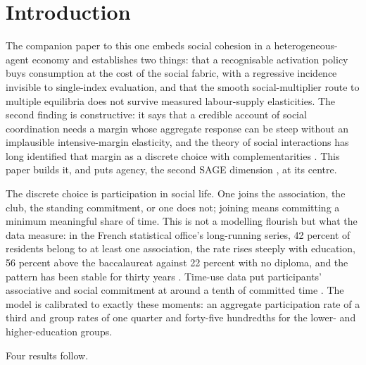 \documentclass[11pt]{article}
\begin{document}
\section{Introduction}

The companion paper to this one embeds social cohesion in a heterogeneous-agent economy and establishes two things: that a recognisable activation policy buys consumption at the cost of the social fabric, with a regressive incidence invisible to single-index evaluation, and that the smooth social-multiplier route to multiple equilibria does not survive measured labour-supply elasticities. The second finding is constructive: it says that a credible account of social coordination needs a margin whose aggregate response can be steep without an implausible intensive-margin elasticity, and the theory of social interactions has long identified that margin as a discrete choice with complementarities \citep{brock2001}. This paper builds it, and puts agency, the second SAGE dimension \citep{snower2020}, at its centre.

The discrete choice is participation in social life. One joins the association, the club, the standing commitment, or one does not; joining means committing a minimum meaningful share of time. This is not a modelling flourish but what the data measure: in the French statistical office's long-running series, 42 percent of residents belong to at least one association, the rate rises steeply with education, 56 percent above the baccalaureat against 22 percent with no diploma, and the pattern has been stable for thirty years \citep{insee2016}. Time-use data put participants' associative and social commitment at around a tenth of committed time \citep{roy2012}. The model is calibrated to exactly these moments: an aggregate participation rate of a third and group rates of one quarter and forty-five hundredths for the lower- and higher-education groups.

Four results follow.
\end{document}
